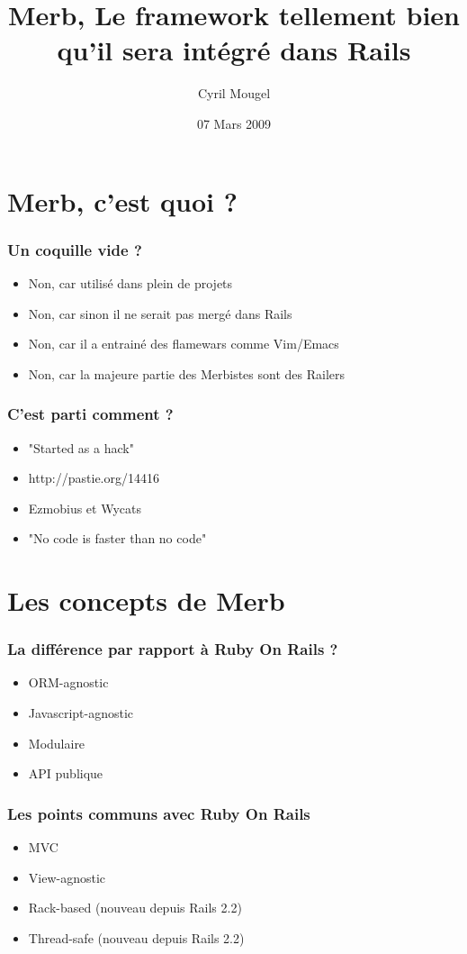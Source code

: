 \documentclass{beamer}
\title{Merb, Le framework tellement bien qu'il sera intégré dans Rails}
\author{Cyril Mougel}
\date{07 Mars 2009}
\begin{document}
\begin{frame}
    \titlepage
\end{frame}

\section{Merb, c'est quoi ?}

\begin{frame}
	\frametitle{Un coquille vide ?}
	\begin{itemize}
		\item Non, car utilisé dans plein de projets
		\item Non, car sinon il ne serait pas mergé dans Rails
		\item Non, car il a entrainé des flamewars comme Vim/Emacs
        \item Non, car la majeure partie des Merbistes sont des Railers
	\end{itemize}
\end{frame}

\begin{frame}
    \frametitle{C'est parti comment ?}
    \begin{itemize}
        \item "Started as a hack"
        \item http://pastie.org/14416
        \item Ezmobius et Wycats
        \item "No code is faster than no code"
    \end{itemize}
\end{frame}

\section{Les concepts de Merb}

\begin{frame}
    \frametitle{La différence par rapport à Ruby On Rails ?}
    \begin{itemize}
        \item ORM-agnostic
        \item Javascript-agnostic
        \item Modulaire
        \item API publique
    \end{itemize}
\end{frame}

\begin{frame}
    \frametitle{Les points communs avec Ruby On Rails}
    \begin{itemize}
        \item MVC
        \item View-agnostic
        \item Rack-based (nouveau depuis Rails 2.2)
        \item Thread-safe (nouveau depuis Rails 2.2)
    \end{itemize}
\end{frame}
\end{document}
